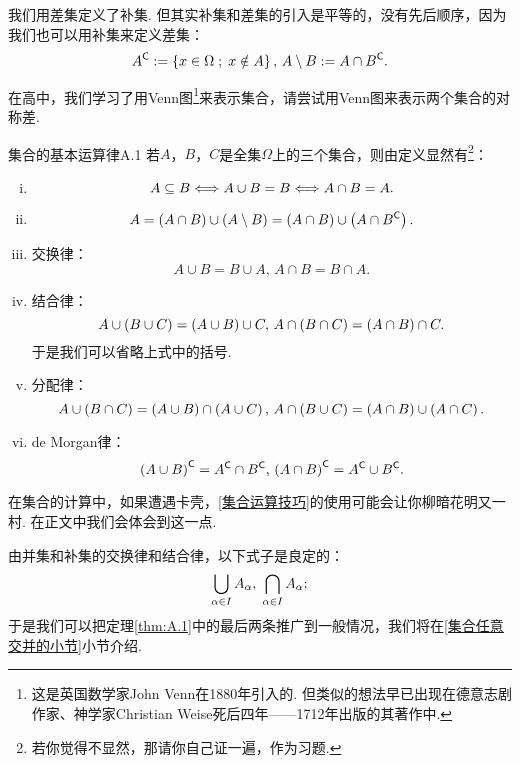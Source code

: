 \begin{remark}
    我们用差集定义了补集. 但其实补集和差集的引入是平等的，没有先后顺序，因为我们也可以用补集来定义差集：\[ A\c \defi \z\{ x\in\Omega\;;\;x\notin A \y\},\, A\m B \defi A \cap B\c.  \]
\end{remark}

\begin{exercise}
    在高中，我们学习了用Venn图\footnote{这是英国数学家John Venn在1880年引入的. 但类似的想法早已出现在德意志剧作家、神学家Christian Weise死后四年——1712年出版的其著作中.}来表示集合，请尝试用Venn图来表示两个集合的对称差.
\end{exercise}
\vspace{1cm}



\begin{theorem}{集合的基本运算律}{A.1}
    若$A$，$B$，$C$是全集$\Omega$上的三个集合，则由定义显然有\footnote{若你觉得不显然，那请你自己证一遍，作为习题.}：
\begin{enumerate}[(i)]
    \item \[    A\sb B \iff A \cup B = B \iff A\cap B=A.   \]
    \item \[    A=\z(A\cap B\y)\cup\z(A\m B\y) = \z(A\cap B\y)\cup\z(A\cap B\c\y).   \] \label{集合运算技巧}
    \item 交换律： \[   A\cup B=B\cup A,\, A\cap B=B\cap A. \] \label{集合交换律}
    \item 结合律： \[   A\cup\z(B\cup C\y)=\z( A\cup B \y)\cup C,\, A\cap\z(B\cap C\y)=\z( A\cap B \y)\cap C.   \] 于是我们可以省略上式中的括号. \label{集合结合律}
    \item 分配律： \[   A\cup\z(B\cap C\y)= \z(A\cup B\y)\cap\z(A\cup C\y),\,A\cap\z(B\cup C\y)= \z(A\cap B\y)\cup\z(A\cap C\y). \] \label{集合分配律}
    \item de Morgan律： \[    \z(A\cup B\y)\c=A\c\cap B\c,\,\z(A\cap B\y)\c=A\c\cup B\c.   \] \label{de Morgan律}
\end{enumerate}
\end{theorem}

\begin{remark}
    在集合的计算中，如果遭遇卡壳，\ref{集合运算技巧}的使用可能会让你柳暗花明又一村. 在正文中我们会体会到这一点.
\end{remark}
\begin{remark}
    由并集和补集的交换律和结合律，以下式子是良定的：
    \[   \bcup_{\alpha\in I} A_\alpha,\;\bcap_{\alpha\in I} A_\alpha;  \]
    于是我们可以把定理\ref{thm:A.1}中的最后两条推广到一般情况，我们将在\ref{集合任意交并的小节}小节介绍.
\end{remark}


